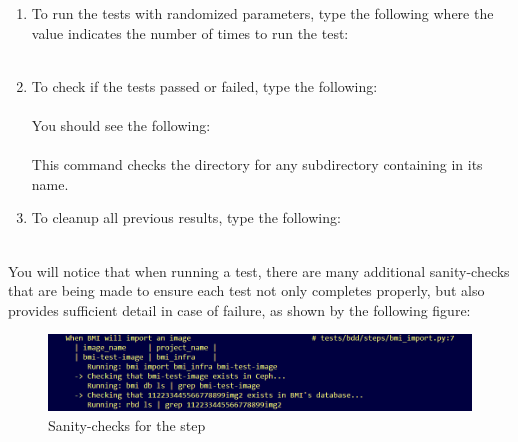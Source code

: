 \begin{enumerate}
\item To run the tests with randomized parameters, type the following where the value indicates the number of times to run the test: \\

 \\

\item To check if the tests passed or failed, type the following: \\

 \\

  You should see the following: \\
 
 \\

  This command checks the  directory for any subdirectory containing  in its name. \\
 
\item To cleanup all previous results, type the following: \\

 \\

\end{enumerate}

You will notice that when running a test, there are many additional sanity-checks that are being made to ensure each test not only completes properly, but also provides sufficient detail in case of failure, as shown by the following figure:

\begin{figure}[!h] %
\vspace{10mm}
\begin{center}
\includegraphics[scale=0.7]{figures/uat-test-check.png}
\end{center}
\caption{Sanity-checks for the  step}
\label{fig:uat-prepare-environment-list}
\end{figure}



